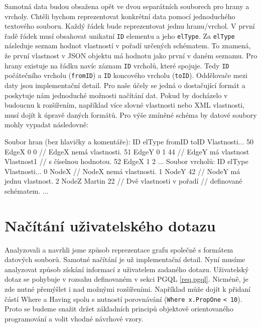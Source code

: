 Samotná data budou obsažena opět ve dvou separátních souborech pro hrany a vrcholy.
Chtěli bychom reprezentovat konkrétní data pomocí jednoduchého textového souboru.
Každý řádek bude reprezentovat jednu hranu/vrchol.
V první řadě řádek musí obsahovat unikatní \verb+ID+ elementu a jeho \verb+elType+. 
Za \verb+elType+ následuje seznam hodnot vlastností v pořadí určených schématem.
To znamená, že první vlastnost v JSON objektu má hodnotu jako první v daném seznamu.
Pro hrany existuje na řádku navíc záznam \verb+ID+ vrcholů, které spojuje.
Tedy \texttt{ID} počátečního vrcholu (\texttt{fromID}) a \texttt{ID} koncového vrcholu (\texttt{toID}). 
Oddělovače mezi daty jsou implementační detail.
Pro naše účely se jedná o dostačující formát a poskytuje nám jednoduché možnosti načítání dat.
Pokud by docházelo v budoucnu k rozšířením, například více slovné vlastnosti nebo XML vlastnosti, musí dojít k úpravě daných formátů.
Pro výše zmíněné schéma by datové soubory mohly vypadat následovně:
\begin{code}
Soubor hran (bez hlavičky a komentáře):
ID elType fromID toID Vlastnosti... 
50 EdgeX 0 0    // EdgeX nemá vlastnosti.
51 EdgeY 0 1 44 // EdgeY má vlastnost Vlastnost1
                // s číselnou hodnotou.
52 EdgeX 1 2   
...
Soubor vrcholů:
ID elType Vlastnosti...
0 NodeX    // NodeX nemá vlastnosti.
1 NodeY 42 // NodeY má jednu vlastnost.
2 NodeZ Martin 22 // Dvě vlastnosti v pořadí
                  // definované schématem.
...
\end{code}

\section{Načítání uživatelského dotazu} \label{anal.parsing}

Analyzovali a navrhli jsme způsob reprezentace grafu společně s formátem datových souborů.
Samotné načítání je už implementační detail.
Nyní musíme analyzovat způsob získání informací z uživatelem zadaného dotazu. 
Uživatelský dotaz se pohybuje v rozsahu definovaném v sekci PGQL \ref{req.pgql}.
Nicméně, je zde nutné přemýšlet i nad možnými rozšířeními.
Například může dojít k přidaní částí Where a Having spolu s nutností porovnávání (\texttt{Where x.PropOne} \texttt{< 10}).
Proto se budeme snažit držet základních principů objektově orientovaného programování a volit vhodné návrhové vzory.

